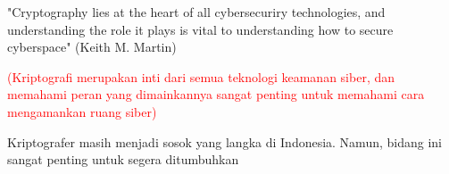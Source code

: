 \documentclass{article}
\begin{document}

"Cryptography lies at the heart of all cybersecuriry technologies, and understanding the role it plays is vital to understanding how to secure cyberspace" (Keith M. Martin)

\textcolor{red}{(Kriptografi merupakan inti dari semua teknologi keamanan siber, dan memahami peran yang dimainkannya sangat penting untuk memahami cara mengamankan ruang siber)}

\vspace{10mm}

Kriptografer masih menjadi sosok yang langka di Indonesia. Namun, bidang ini sangat penting untuk segera ditumbuhkan
\end{document}
